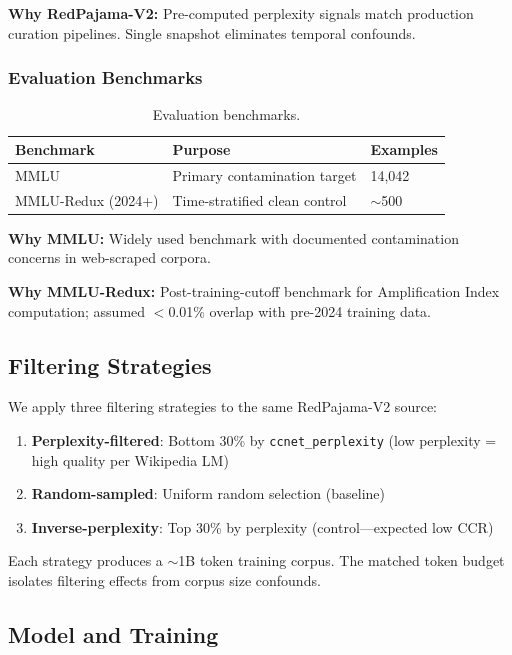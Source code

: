 \textbf{Why RedPajama-V2:} Pre-computed perplexity signals match production curation pipelines. Single snapshot eliminates temporal confounds.

\subsubsection{Evaluation Benchmarks}

\begin{table}[h]
\centering
\begin{tabular}{@{}lll@{}}
\toprule
Benchmark & Purpose & Examples \\
\midrule
MMLU & Primary contamination target & 14,042 \\
MMLU-Redux (2024+) & Time-stratified clean control & $\sim$500 \\
\bottomrule
\end{tabular}
\caption{Evaluation benchmarks.}
\end{table}

\textbf{Why MMLU:} Widely used benchmark with documented contamination concerns in web-scraped corpora.

\textbf{Why MMLU-Redux:} Post-training-cutoff benchmark for Amplification Index computation; assumed $<$0.01\% overlap with pre-2024 training data.

\subsection{Filtering Strategies}

We apply three filtering strategies to the same RedPajama-V2 source:

\begin{enumerate}
    \item \textbf{Perplexity-filtered}: Bottom 30\% by \texttt{ccnet\_perplexity} (low perplexity = high quality per Wikipedia LM)
    \item \textbf{Random-sampled}: Uniform random selection (baseline)
    \item \textbf{Inverse-perplexity}: Top 30\% by perplexity (control---expected low CCR)
\end{enumerate}

Each strategy produces a $\sim$1B token training corpus. The matched token budget isolates filtering effects from corpus size confounds.

\subsection{Model and Training}

